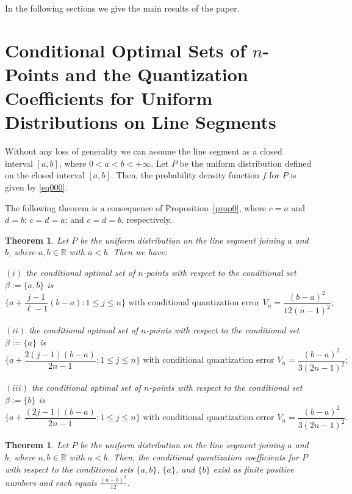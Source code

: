 \documentclass[12pt, reqno]{amsart}
\theoremstyle{plain}
\newtheorem{theorem}[subsection]{Theorem}
\theoremstyle{definition}
\newcommand{\set}[1]{\{#1\}}%
\newcommand{\gb}{\beta}
\newcommand{\D}[1]{\mathbb{#1}}%
\newcommand{\te}{\text}%
\begin{document}
In the following sections we give the main results of the paper. 




 \section{Conditional Optimal Sets of $n$-Points and the Quantization Coefficients for Uniform Distributions on Line Segments} \label{sec2} 
 
Without any loss of generality we can assume the line segment as a closed interval $[a, b]$, where $0<a<b<+\infty$. Let $P$ be the uniform distribution defined on the closed interval $[a, b]$. Then, the probability density function $f$ for $P$ is given by \eqref{eq000}.  

The following theorem is a consequence of Proposition~\ref{prop0}, where $c = a$ and $d = b$; $c = d = a$; and $c = d = b$, respectively.
\begin{theorem}\label{theoM0}
Let $P$ be the uniform distribution on the line segment joining $a$ and $b$, where $a, b\in \D R$ with $a<b$. Then we have:  

$(i)$ the conditional optimal set of $n$-points with respect to the conditional set $\gb:=\set{a, b}$ is  
\[\Big\{a+\frac{j-1}{\ell-1}(b-a) : 1\leq j\leq n\Big\} \te{ with conditional quantization error } V_n=\frac {(b-a)^2}{12(n-1)^2};\]


$(ii)$ the conditional optimal set of $n$-points with respect to the conditional set $\gb:=\set{a}$ is  
\[\Big\{a+\frac{2(j-1)(b-a)}{2n-1}   : 1\leq j\leq n\Big\} \te{ with conditional quantization error } V_n=\frac {(b-a)^2}{3(2n-1)^2};\]

$(iii)$ the conditional optimal set of $n$-points with respect to the conditional set $\gb:=\set{b}$ is  
\[\Big\{a+\frac{(2j-1)(b-a)}{2n-1}   : 1\leq j\leq n\Big\} \te{ with conditional quantization error } V_n=\frac {(b-a)^2}{3(2n-1)^2}.\]
\end{theorem}


\begin{theorem}\label{theoM00}
Let $P$ be the uniform distribution on the line segment joining $a$ and $b$, where $a, b\in \D R$ with $a<b$. Then, the conditional quantization coefficients for $P$  with respect to the conditional sets $\set{a, b}$, $\set{a}$, and $\set{b}$ exist as finite positive numbers and each equals $\frac{(a-b)^2}{12}$. 
\end{theorem}
\end{document}

